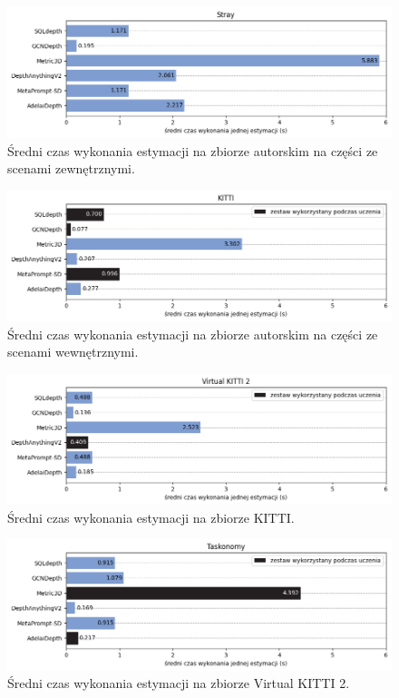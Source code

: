 \begin{figure}[H]
    \centering
    \includegraphics{plots/exec_time/3}
    \caption{Średni czas wykonania estymacji na zbiorze autorskim na części ze scenami zewnętrznymi.}
    \label{fig:exec_time_3}
\end{figure}
\begin{figure}[H]
    \centering
    \includegraphics{plots/exec_time/4}
    \caption{Średni czas wykonania estymacji na zbiorze autorskim na części ze scenami wewnętrznymi.}
    \label{fig:exec_time_4}
\end{figure}
\begin{figure}[H]
    \centering
    \includegraphics{plots/exec_time/5}
    \caption{Średni czas wykonania estymacji na zbiorze KITTI.}
    \label{fig:exec_time_5}
\end{figure}
\begin{figure}[H]
    \centering
    \includegraphics{plots/exec_time/6}
    \caption{Średni czas wykonania estymacji na zbiorze Virtual KITTI 2.}
    \label{fig:exec_time_6}
\end{figure}
